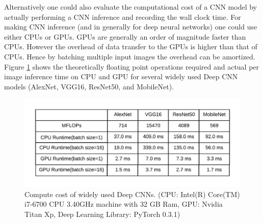 Alternatively one could also evaluate the computational cost of a CNN model by actually performing a CNN inference and recording the wall clock time. For making CNN inference (and in generally for deep neural networks) one could use either CPUs or GPUs. GPUs are generally an order of magnitude faster than CPUs. However the overhead of data transfer to the GPUs is higher than that of CPUs. Hence by batching multiple input images the overhead can be amortized. Figure \ref{fig:compute_cost} shows the theoretically floating point operations required and actual per image inference time on CPU and GPU for several widely used Deep CNN models (AlexNet, VGG16, ResNet50, and MobileNet).

\begin{figure}
  \includegraphics[width=\columnwidth]{./images/compute_cost}
  \caption{Compute cost of widely used Deep CNNs. (CPU: Intel(R) Core(TM) i7-6700 CPU \@ 3.40GHz machine with 32 GB Ram, GPU: Nvidia Titan Xp, Deep Learning Library: PyTorch 0.3.1)}
  \label{fig:compute_cost}
\end{figure}